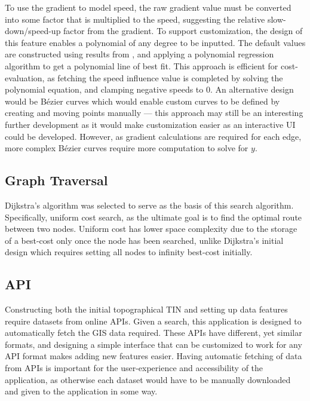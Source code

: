 \documentclass[12pt]{article}
\begin{document}
To use the gradient to model speed, the raw gradient value must be converted into some factor that is multiplied to the speed, suggesting the relative slow-down/speed-up factor from the gradient. To support customization, the design of this feature enables a polynomial of any degree to be inputted. The default values are constructed using results from \autocite{horiuchi2015comparisons}, and applying a polynomial regression algorithm to get a polynomial line of best fit. This approach is efficient for cost-evaluation, as fetching the speed influence value is completed by solving the polynomial equation, and clamping negative speeds to 0. An alternative design would be Bézier curves which would enable custom curves to be defined by creating and moving points manually --- this approach may still be an interesting further development as it would make customization easier as an interactive UI could be developed. However, as gradient calculations are required for each edge, more complex Bézier curves require more computation to solve for $y$.

\subsection{Graph Traversal}

Dijkstra's algorithm was selected to serve as the basis of this search algorithm. Specifically, uniform cost search, as the ultimate goal is to find the optimal route between two nodes. Uniform cost has lower space complexity due to the storage of a best-cost only once the node has been searched, unlike Dijkstra's initial design which requires setting all nodes to infinity best-cost initially.

\subsection{API}

Constructing both the initial topographical TIN and setting up data features require datasets from online APIs. Given a search, this application is designed to automatically fetch the GIS data required. These APIs have different, yet similar formats, and designing a simple interface that can be customized to work for any API format makes adding new features easier. Having automatic fetching of data from APIs is important for the user-experience and accessibility of the application, as otherwise each dataset would have to be manually downloaded and given to the application in some way.
\end{document}
